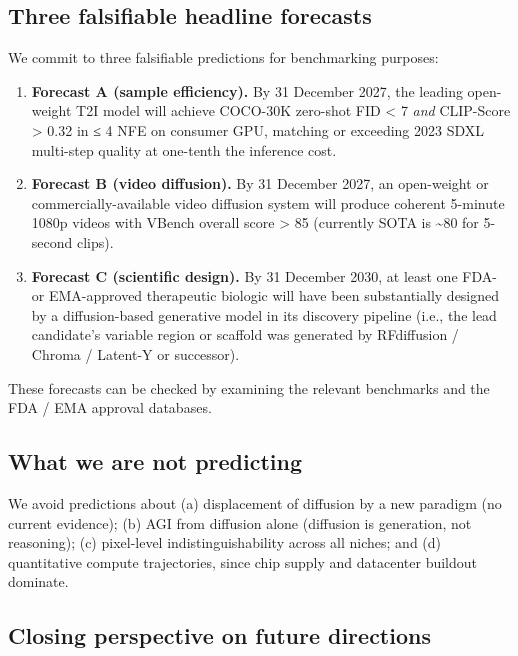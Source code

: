 \subsection{Three falsifiable headline forecasts}\label{three-falsifiable-headline-forecasts}

We commit to three falsifiable predictions for benchmarking purposes:

\begin{enumerate}
\def\labelenumi{\arabic{enumi}.}
\tightlist
\item
  \textbf{Forecast A (sample efficiency).} By 31 December 2027, the leading open-weight T2I model will achieve COCO-30K zero-shot FID \textless{} 7 \emph{and} CLIP-Score \textgreater{} 0.32 in ≤ 4 NFE on consumer GPU, matching or exceeding 2023 SDXL multi-step quality at one-tenth the inference cost.
\item
  \textbf{Forecast B (video diffusion).} By 31 December 2027, an open-weight or commercially-available video diffusion system will produce coherent 5-minute 1080p videos with VBench overall score \textgreater{} 85 (currently SOTA is \textasciitilde80 for 5-second clips).
\item
  \textbf{Forecast C (scientific design).} By 31 December 2030, at least one FDA- or EMA-approved therapeutic biologic will have been substantially designed by a diffusion-based generative model in its discovery pipeline (i.e., the lead candidate's variable region or scaffold was generated by RFdiffusion / Chroma / Latent-Y or successor).
\end{enumerate}

These forecasts can be checked by examining the relevant benchmarks and the FDA / EMA approval databases.

\subsection{What we are not predicting}\label{what-we-are-not-predicting}

We avoid predictions about (a) displacement of diffusion by a new paradigm (no current evidence); (b) AGI from diffusion alone (diffusion is generation, not reasoning); (c) pixel-level indistinguishability across all niches; and (d) quantitative compute trajectories, since chip supply and datacenter buildout dominate.

\subsection{Closing perspective on future directions}\label{closing-perspective-on-future-directions}

